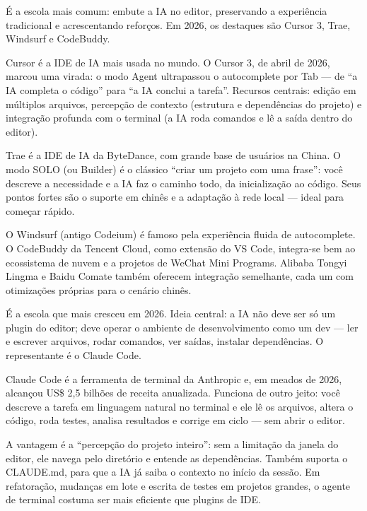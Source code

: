
É a escola mais comum: embute a IA no editor, preservando a experiência tradicional e acrescentando reforços. Em 2026, os destaques são Cursor 3, Trae, Windsurf e CodeBuddy.


Cursor é a IDE de IA mais usada no mundo. O Cursor 3, de abril de 2026, marcou uma virada: o modo Agent ultrapassou o autocomplete por Tab — de “a IA completa o código” para “a IA conclui a tarefa”. Recursos centrais: edição em múltiplos arquivos, percepção de contexto (estrutura e dependências do projeto) e integração profunda com o terminal (a IA roda comandos e lê a saída dentro do editor).


Trae é a IDE de IA da ByteDance, com grande base de usuários na China. O modo SOLO (ou Builder) é o clássico “criar um projeto com uma frase”: você descreve a necessidade e a IA faz o caminho todo, da inicialização ao código. Seus pontos fortes são o suporte em chinês e a adaptação à rede local — ideal para começar rápido.


O Windsurf (antigo Codeium) é famoso pela experiência fluida de autocomplete. O CodeBuddy da Tencent Cloud, como extensão do VS Code, integra-se bem ao ecossistema de nuvem e a projetos de WeChat Mini Programs. Alibaba Tongyi Lingma e Baidu Comate também oferecem integração semelhante, cada um com otimizações próprias para o cenário chinês.


É a escola que mais cresceu em 2026. Ideia central: a IA não deve ser só um plugin do editor; deve operar o ambiente de desenvolvimento como um dev — ler e escrever arquivos, rodar comandos, ver saídas, instalar dependências. O representante é o Claude Code.


Claude Code é a ferramenta de terminal da Anthropic e, em meados de 2026, alcançou US\$ 2,5 bilhões de receita anualizada. Funciona de outro jeito: você descreve a tarefa em linguagem natural no terminal e ele lê os arquivos, altera o código, roda testes, analisa resultados e corrige em ciclo — sem abrir o editor.

A vantagem é a “percepção do projeto inteiro”: sem a limitação da janela do editor, ele navega pelo diretório e entende as dependências. Também suporta o CLAUDE.md, para que a IA já saiba o contexto no início da sessão. Em refatoração, mudanças em lote e escrita de testes em projetos grandes, o agente de terminal costuma ser mais eficiente que plugins de IDE.


